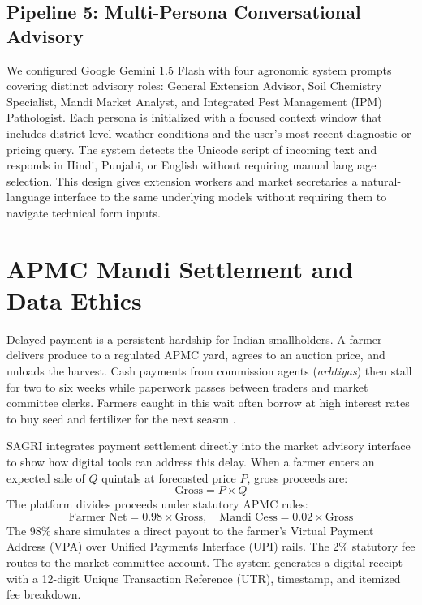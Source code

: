\documentclass[conference]{IEEEtran}
\begin{document}
\subsection{Pipeline 5: Multi-Persona Conversational Advisory}
We configured Google Gemini 1.5 Flash with four agronomic system prompts covering distinct advisory roles: General Extension Advisor, Soil Chemistry Specialist, Mandi Market Analyst, and Integrated Pest Management (IPM) Pathologist. Each persona is initialized with a focused context window that includes district-level weather conditions and the user's most recent diagnostic or pricing query. The system detects the Unicode script of incoming text and responds in Hindi, Punjabi, or English without requiring manual language selection. This design gives extension workers and market secretaries a natural-language interface to the same underlying models without requiring them to navigate technical form inputs.

\section{APMC Mandi Settlement and Data Ethics}
Delayed payment is a persistent hardship for Indian smallholders. A farmer delivers produce to a regulated APMC yard, agrees to an auction price, and unloads the harvest. Cash payments from commission agents (\textit{arhtiyas}) then stall for two to six weeks while paperwork passes between traders and market committee clerks. Farmers caught in this wait often borrow at high interest rates to buy seed and fertilizer for the next season \cite{ref_nabard}.

SAGRI integrates payment settlement directly into the market advisory interface to show how digital tools can address this delay. When a farmer enters an expected sale of $Q$ quintals at forecasted price $P$, gross proceeds are:
\begin{equation}
\text{Gross} = P \times Q
\end{equation}
The platform divides proceeds under statutory APMC rules:
\begin{equation}
\text{Farmer Net} = 0.98 \times \text{Gross}, \quad \text{Mandi Cess} = 0.02 \times \text{Gross}
\end{equation}
The 98\% share simulates a direct payout to the farmer's Virtual Payment Address (VPA) over Unified Payments Interface (UPI) rails. The 2\% statutory fee routes to the market committee account. The system generates a digital receipt with a 12-digit Unique Transaction Reference (UTR), timestamp, and itemized fee breakdown.
\end{document}
